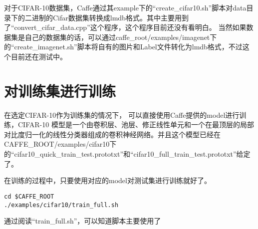 对于CIFAR-10数据集，Caffe通过其example下的“create\_cifar10.sh”脚本对data目录下的二进制的Cifar数据集转换成lmdb格式。其中主要用到了“convert\_cifar\_data.cpp”这个程序，这个程序目前还没有看明白。
当然如果数据集是自己的数据集的话，可以通过caffe\_root/examples/imagenet下的“create\_imagenet.sh”脚本将自有的图片和Label文件转化为lmdb格式，不过这个目前还在测试中。



\section{对训练集进行训练}

在选定CIFAR-10作为训练集的情况下， 可以直接使用Caffe提供的model进行训练，CIFAR-10 模型是一个由卷积层、池层、修正线性单元和一个在最顶层的局部对比度归一化的线性分类器组成的卷积神经网络。并且这个模型已经在 CAFFE\_ROOT/examples/cifar10下的“cifar10\_quick\_train\_test.prototxt”和“cifar10\_full\_train\_test.prototxt”给定了。

在训练的过程中，只要使用对应的model对测试集进行训练就好了。

\begin{lstlisting}
cd $CAFFE_ROOT
./examples/cifar10/train_full.sh
\end{lstlisting}

通过阅读“train\_full.sh”，可以知道脚本主要使用了 


